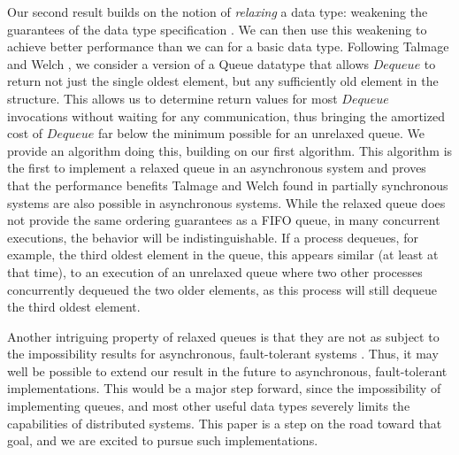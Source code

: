\documentclass[a4paper,anonymous,USenglish]{lipics-v2021} %
\theoremstyle{definition}
\begin{document}
Our second result builds on the notion of \emph{relaxing} a data type: weakening the guarantees of the data type specification \cite{HenzingerKirschPayerSezginSokolova13}.  We can then use this weakening to achieve better performance than we can for a basic data type.  Following Talmage and Welch \cite{TalmageWelch14}, we consider a version of a Queue datatype that allows $Dequeue$ to return not just the single oldest element, but any sufficiently old element in the structure.  This allows us to determine return values for most $Dequeue$ invocations without waiting for any communication, thus bringing the amortized cost of $Dequeue$ far below the minimum possible for an unrelaxed queue.  We provide an algorithm doing this, building on our first algorithm.  This algorithm is the first to implement a relaxed queue in an asynchronous system and proves that the performance benefits Talmage and Welch \cite{TalmageWelch14} found in partially synchronous systems are also possible in asynchronous systems.  While the relaxed queue does not provide the same ordering guarantees as a FIFO queue, in many concurrent executions, the behavior will be indistinguishable.  If a process dequeues, for example, the third oldest element in the queue, this appears similar (at least at that time), to an execution of an unrelaxed queue where two other processes concurrently dequeued the two older elements, as this process will still dequeue the third oldest element.

Another intriguing property of relaxed queues is that they are not as subject to the impossibility results for asynchronous, fault-tolerant systems \cite{ShavitTaubenfeld16,TalmageWelch19}.  Thus, it may well be possible to extend our result in the future to asynchronous, fault-tolerant implementations.  This would be a major step forward, since the impossibility of implementing queues, and most other useful data types severely limits the capabilities of distributed systems.  This paper is a step on the road toward that goal, and we are excited to pursue such implementations.

\end{document}
